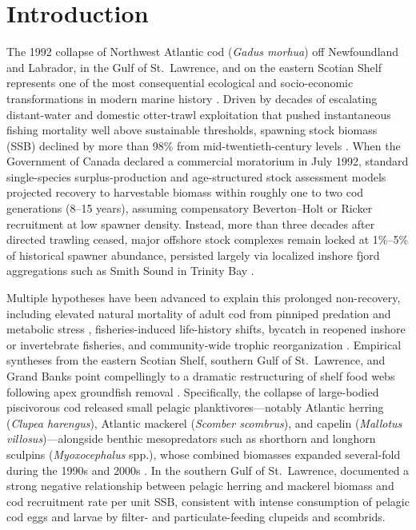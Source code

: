 \documentclass[11pt,letterpaper]{article}
\begin{document}
\begin{abstract}
\vspace{0.5em}
\noindent\textbf{Keywords:} Atlantic cod (\emph{Gadus morhua}), cultivation--depensation, alternative stable states, hysteresis, size-spectrum modelling, \texttt{mizer}, ecosystem-based fisheries management, forage fish.
\end{abstract}

\section{Introduction}

The 1992 collapse of Northwest Atlantic cod (\emph{Gadus morhua}) off Newfoundland and Labrador, in the Gulf of St.~Lawrence, and on the eastern Scotian Shelf represents one of the most consequential ecological and socio-economic transformations in modern marine history \citep{hutchings1994what,myers1997why,lilly2013review}. Driven by decades of escalating distant-water and domestic otter-trawl exploitation that pushed instantaneous fishing mortality well above sustainable thresholds, spawning stock biomass (SSB) declined by more than 98\% from mid-twentieth-century levels \citep{hutchings1994what,myers1997why}. When the Government of Canada declared a commercial moratorium in July 1992, standard single-species surplus-production and age-structured stock assessment models projected recovery to harvestable biomass within roughly one to two cod generations (8--15 years), assuming compensatory Beverton--Holt or Ricker recruitment at low spawner density. Instead, more than three decades after directed trawling ceased, major offshore stock complexes remain locked at 1\%--5\% of historical spawner abundance, persisted largely via localized inshore fjord aggregations such as Smith Sound in Trinity Bay \citep{shelton2006fishing,swain2008predicted,lilly2013review}.

Multiple hypotheses have been advanced to explain this prolonged non-recovery, including elevated natural mortality of adult cod from pinniped predation and metabolic stress \citep{swain2008predicted,shelton2006fishing}, fisheries-induced life-history shifts, bycatch in reopened inshore or invertebrate fisheries, and community-wide trophic reorganization \citep{frank2005trophic,bundy2005can}. Empirical syntheses from the eastern Scotian Shelf, southern Gulf of St.~Lawrence, and Grand Banks point compellingly to a dramatic restructuring of shelf food webs following apex groundfish removal \citep{swain2000pelagic,frank2005trophic}. Specifically, the collapse of large-bodied piscivorous cod released small pelagic planktivores---notably Atlantic herring (\emph{Clupea harengus}), Atlantic mackerel (\emph{Scomber scombrus}), and capelin (\emph{Mallotus villosus})---alongside benthic mesopredators such as shorthorn and longhorn sculpins (\emph{Myoxocephalus} spp.), whose combined biomasses expanded several-fold during the 1990s and 2000s \citep{frank2005trophic,bundy2005can}. In the southern Gulf of St.~Lawrence, \citet{swain2000pelagic} documented a strong negative relationship between pelagic herring and mackerel biomass and cod recruitment rate per unit SSB, consistent with intense consumption of pelagic cod eggs and larvae by filter- and particulate-feeding clupeids and scombrids.
\end{document}
